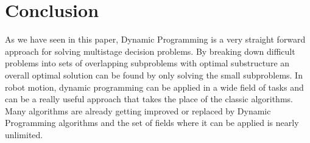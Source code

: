 \documentclass[conference]{IEEEtran}
\begin{document}
\section{Conclusion}
As we have seen in this paper, Dynamic Programming is a very straight forward approach for solving multistage decision problems. By breaking down difficult problems into sets of overlapping subproblems with optimal substructure an overall optimal solution can be found by only solving the small subproblems. In robot motion, dynamic programming can be applied in a wide field of tasks and can be a really useful approach that takes the place of the classic algorithms.
Many algorithms are already getting improved or replaced by Dynamic Programming algorithms and the set of fields where it can be applied is nearly unlimited.









%
%
\end{document}
